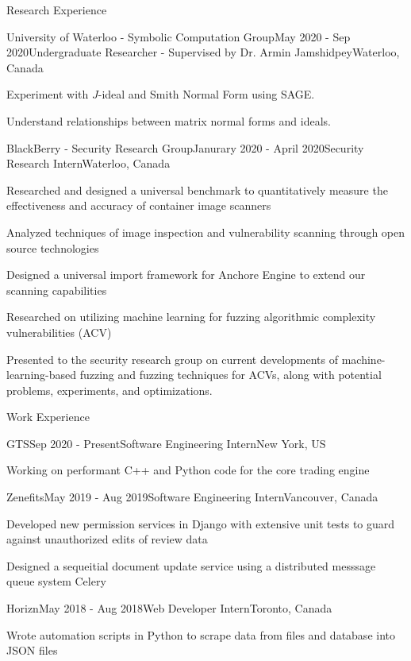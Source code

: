 \documentclass{cv}
\begin{document}
\begin{rSection}{Research Experience}
\begin{rSubsection}{University of Waterloo - Symbolic Computation Group}{May 2020 - Sep 2020}{Undergraduate Researcher - Supervised by Dr. Armin Jamshidpey}{Waterloo, Canada}
	\item Experiment with $J$-ideal and Smith Normal Form using SAGE.
  	\item Understand relationships between matrix normal forms and ideals.
\end{rSubsection}

\begin{rSubsection}{BlackBerry - Security Research Group}{Janurary 2020 - April 2020}{Security Research Intern}{Waterloo, Canada}
	\item Researched and designed a universal benchmark to quantitatively measure the effectiveness and accuracy of container image scanners
	\item Analyzed techniques of image inspection and vulnerability scanning through open source technologies
	\item Designed a universal import framework for Anchore Engine to extend our scanning capabilities
	\item Researched on utilizing machine learning for fuzzing algorithmic complexity vulnerabilities (ACV)
	\item Presented to the security research group on current developments of machine-learning-based fuzzing and fuzzing techniques for ACVs, along with potential problems, experiments, and optimizations.
\end{rSubsection}
\end{rSection}

\begin{rSection}{Work Experience}
\begin{rSubsection}{GTS}{Sep 2020 - Present}{Software Engineering Intern}{New York, US}
	\item Working on performant C++ and Python code for the core trading engine
\end{rSubsection}

\begin{rSubsection}{Zenefits}{May 2019 - Aug 2019}{Software Engineering Intern}{Vancouver, Canada}
	\item Developed new permission services in Django with extensive unit tests to guard against unauthorized edits of review data
	\item Designed a sequeitial document update service using a distributed messsage queue system Celery
\end{rSubsection}

\begin{rSubsection}{Horizn}{May 2018 - Aug 2018}{Web Developer Intern}{Toronto, Canada}
	\item Wrote automation scripts in Python to scrape data from files and database into JSON files
\end{rSubsection}
\end{rSection}
\end{document}
